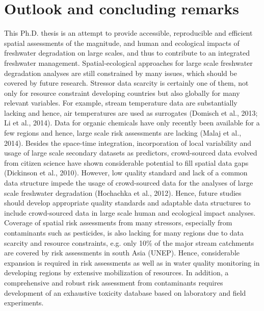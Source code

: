 \section{Outlook and concluding remarks}
\label{Outlook and concluding remarks}

This Ph.D. thesis is an attempt to provide accessible, reproducible and efficient spatial assessments of the magnitude, and human and ecological impacts of freshwater degradation on large scales, and thus to contribute to an integrated freshwater management. Spatial-ecological approaches for large scale freshwater degradation analyses are still constrained by many issues, which should be covered by future research. Stressor data scarcity is certainly one of them, not only for resource constraint developing countries but also globally for many relevant variables. For example, stream temperature data are substantially lacking and hence, air temperatures are used as surrogates (Domisch et al., 2013; Li et al., 2014). Data for organic chemicals have only recently been available for a few regions and hence, large scale risk assessments are lacking (Malaj et al., 2014). Besides the space-time integration, incorporation of local variability and usage of large scale secondary datasets as predictors,  crowd-sourced data evolved from citizen science have shown considerable potential to fill spatial data gaps (Dickinson et al., 2010). However, low quality standard and lack of a common data structure impede the usage of crowd-sourced data for the analyses of large scale freshwater degradation (Hochachka et al., 2012). Hence, future studies should develop appropriate quality standards and adaptable data structures to include crowd-sourced data in large scale human and ecological impact analyses. Coverage of spatial risk assessments from many stressors, especially from contaminants such as pesticides, is also lacking for many regions due to data scarcity and resource constraints, e.g. only 10\% of the major stream catchments are covered by risk assessments in south Asia (UNEP). Hence, considerable expansion is required in risk assessments as well as in water quality monitoring in developing regions by extensive mobilization of resources. In addition, a comprehensive and robust risk assessment from contaminants requires development of an exhaustive toxicity database based on laboratory and field experiments.

